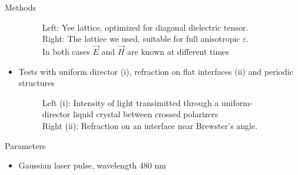 \documentclass[8pt]{beamer}
\newlength{\wideitemsep}
\let\olditem\item
\renewcommand{\item}{\setlength{\itemsep}{\wideitemsep}\olditem}
\newcommand{\blockpadding}{
  \rule[-0.6ex]{0pt}{2.5ex}
}
\begin{document}
\begin{columns}[t]
\begin{column}{.36\textwidth}
\begin{block}{\blockpadding Methods}
\begin{itemize}
\begin{figure}[h]
{}
\label{fig:lattice}
\caption{{\color{dark} Left:} Yee lattice, optimized for diagonal dielectric tensor. \\{\color{dark} Right:} The lattice we used, suitable for full anisotropic $\varepsilon$. \\In both cases $\vec E$ and $\vec H$ are known at different times}
\end{figure}
  \item Tests with uniform director (i), refraction on flat interfaces (ii) and periodic structures
  \vspace{-2ex}
  \begin{figure}[h]
   \centering
   \subfigure{\scalebox{0.7}{}}
   \subfigure{\scalebox{0.77}{}}
   \caption{{\color{dark} Left (i):} Intensity of light transimitted through a uniform-director liquid crystal between crossed polarizers\\
   {\color{dark} Right (ii):} Refraction on an interface near Brewster's angle.}
  \end{figure}
  \vspace{-2ex}
    \end{itemize}
  \end{block}
  
  \begin{block}{\blockpadding Parameters}
  \begin{itemize}
  \item Gaussian laser pulse, wavelength 480 nm


\end{itemize}
\end{block}
\end{column}
\end{columns}
\end{document}
